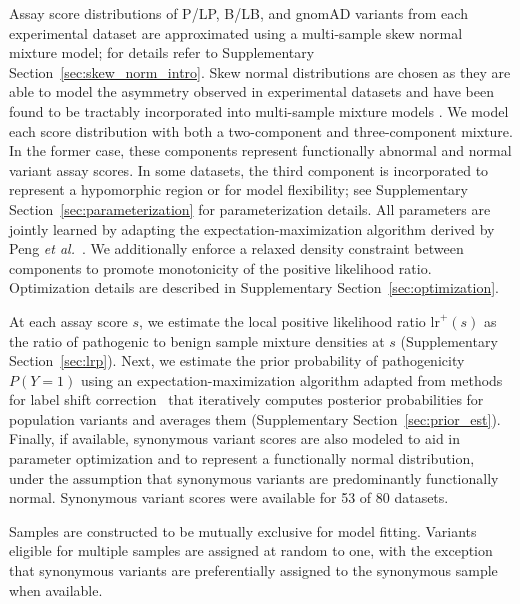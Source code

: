 \documentclass[11pt]{article}
\theoremstyle{plain}
\newcommand{\NumDatasets}{80 }
\newcommand{\NumSynonymousDatasets}{53 }
\begin{document}
Assay score distributions of P/LP, B/LB, and gnomAD variants from each experimental dataset are approximated using a multi-sample skew normal mixture model; for details refer to Supplementary Section~\ref*{sec:skew_norm_intro}. Skew normal distributions are chosen as they are able to model the asymmetry observed in experimental datasets and have been found to be tractably incorporated into multi-sample mixture models \cite{peng2020new}. We model each score distribution with both a two-component and three-component mixture. In the former case, these components represent functionally abnormal and normal variant assay scores. In some datasets, the third component is incorporated to represent a hypomorphic region or for model flexibility; see Supplementary Section~\ref*{sec:parameterization} for parameterization details. All parameters are jointly learned by adapting the expectation-maximization algorithm derived by Peng \textit{et al.}~\cite{peng2020new}. We additionally enforce a relaxed density constraint between components to promote monotonicity of the positive likelihood ratio. Optimization details are described in Supplementary Section~\ref*{sec:optimization}.

At each assay score $s$, we estimate the local positive likelihood ratio $\text{lr}^+(s)$ as the ratio of pathogenic to benign sample mixture densities at $s$ (Supplementary Section~\ref*{sec:lrp}). Next, we estimate the prior probability of pathogenicity $P(Y=1)$ using an expectation-maximization algorithm adapted from methods for label shift correction~\cite{latinne2001adjusting} that iteratively computes posterior probabilities for population variants and averages them (Supplementary Section~\ref*{sec:prior_est}). Finally, if available, synonymous variant scores are also modeled to aid in parameter optimization and to represent a functionally normal distribution, under the assumption that synonymous variants are predominantly functionally normal. Synonymous variant scores were available for \NumSynonymousDatasets of \NumDatasets datasets.

Samples are constructed to be mutually exclusive for model fitting. Variants eligible for multiple samples are assigned at random to one, with the exception that synonymous variants are preferentially assigned to the synonymous sample when available.
\end{document}
